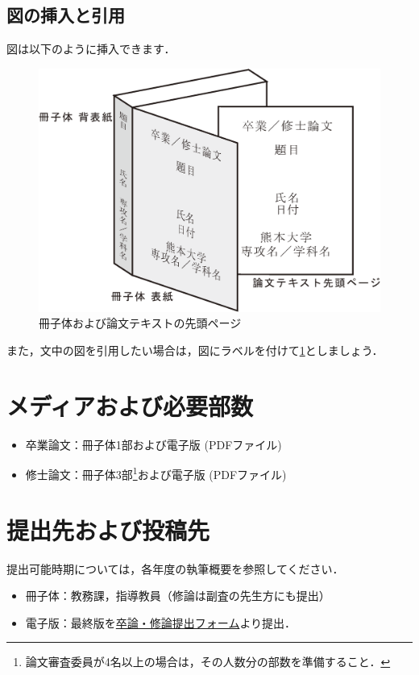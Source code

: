 \documentclass[12pt]{kupaper}
\begin{document}
\section{図の挿入と引用}
図は以下のように挿入できます．
	\begin{figure}[htbp]
		\centering
		\includegraphics[width=1.0\linewidth,keepaspectratio]{./images/book.eps}
		\caption{冊子体および論文テキストの先頭ページ}
		\label{fig:overview}
	\end{figure}

また，文中の図を引用したい場合は，図にラベルを付けて\cref{fig:overview}としましょう．

\chapter{メディアおよび必要部数}
	\begin{itemize}
		\item 卒業論文：冊子体1部および電子版 (PDFファイル)
		\item 修士論文：冊子体3部\footnote{論文審査委員が4名以上の場合は，その人数分の部数を準備すること．}および電子版 (PDFファイル)
	\end{itemize}

\chapter{提出先および投稿先}
提出可能時期については，各年度の執筆概要を参照してください．
	\begin{itemize}
		\item 冊子体：教務課，指導教員（修論は副査の先生方にも提出）
		\item 電子版：最終版を\href{https://forms.gle/ZUT2Erq8iPRBpF4q9}{卒論・修論提出フォーム}より提出．
	\end{itemize}
\end{document}
